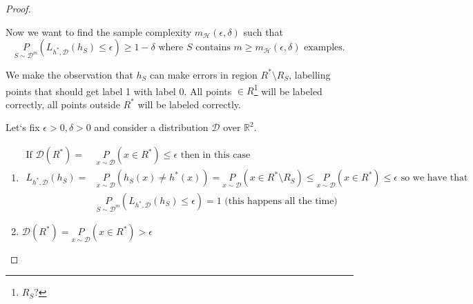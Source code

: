 \documentclass{article}
\newcommand{\<}{\langle}
\renewcommand{\>}{\rangle}
\theoremstyle{definition}
\def\gD{{\mathcal{D}}}
\def\gH{{\mathcal{H}}}
\def\sR{{\mathbb{R}}}
\newcommand{\uset}{\underset}
\newcommand{\epd}{(\epsilon, \delta)}
\newcommand{\mgh}{m_{\gH}}
\newcommand{\psdm}{\uset{S \sim \gD^m}{P}}
\newcommand{\hs}{h_S}
\newcommand{\hsx}{h_S(x)}
\newcommand{\sRs}{\sR^2}
\newcommand{\uset}{\underset}
\newcommand{\epd}{(\epsilon, \delta)}
\newcommand{\mgh}{m_{\gH}}
\newcommand{\psdm}{\uset{S \sim \gD^m}{P}}
\newcommand{\hs}{h_S}
\newcommand{\hsx}{h_S(x)}
\newcommand{\sRs}{\sR^2}
\begin{document}
\begin{proof}
\begin{figure}[h]
\end{figure}

Now we want to find the sample complexity $\mgh\epd$ such that
\begin{equation*}
\uset{S \sim {\gD}^m}{P} (L_{h^*, \gD}(\hs) \leq \epsilon) \geq 1-\delta \text{ where } S
\text{ contains } m \geq \mgh\epd \text{ examples.}
\end{equation*}

We make the observation that $\hs$ can make errors in region $R^* \setminus R_S$, labelling
points that should get label 1 with label 0. All points $\in R$\footnote{$R_S$?} will be labeled correctly,
all points outside $R^*$ will be labeled correctly.

Let`s fix $\epsilon > 0, \delta > 0$ and consider a distribution $\gD$ over $\sRs$.

\begin{enumerate}[itemindent=0.5cm,label=Case \arabic*)]
  \item
  \begin{align*}
    \text{If }\gD(R^*) =& \uset{x \sim \gD}{P}(x \in R^*) \leq \epsilon
      \text{ then in this case} \\
    L_{h^*, \gD}(\hs)  =& \uset{x \sim \gD}{P}(\hsx \neq h^*(x)) =
      \uset{x \sim \gD}{P}(x \in R^* \setminus R_S) \leq
      \uset{x \sim \gD}{P}(x \in R^*) \leq \epsilon \text{ so we have that} \\
    &\psdm(L_{h^*, \gD}(\hs) \leq \epsilon) = 1
      \text{ (this happens all the time)}
  \end{align*}

  \item $\gD(R^*) = \uset{x \sim \gD}{P}(x \in R^*) > \epsilon$
    
    \begin{figure}[h]
\end{figure}
\end{enumerate}
\end{proof}
\end{document}
